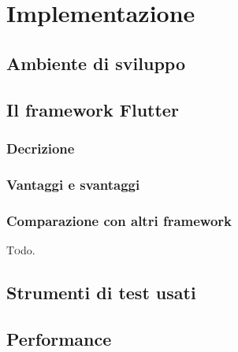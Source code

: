 \chapter{Implementazione\label{sec:implementazione}}

\section{Ambiente di sviluppo\label{sec:ambiente}}

\section{Il framework Flutter\label{sec:flutter}}
\subsection{Decrizione\label{sec:flutter-descrizione}}

\subsection{Vantaggi e svantaggi\label{sec:flutter-vantaggi}}

\subsection{Comparazione con altri framework\label{sec:flutter-comparazione}}
\lettrine[findent=1.5em]{T}odo.

\section{Strumenti di test usati}

\section{Performance}
